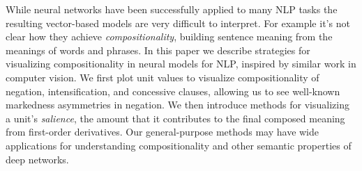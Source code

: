 While neural networks have been successfully applied to many NLP tasks the resulting vector-based models are very difficult to interpret. For example it's not clear how they achieve {\em compositionality}, building sentence meaning from the meanings of words and phrases. In this paper we describe strategies for visualizing compositionality in neural models for NLP, inspired by similar work in computer vision. We first plot unit values to visualize compositionality of negation, intensification, and concessive clauses, allowing us to see well-known markedness asymmetries in negation. We then introduce methods for visualizing a unit's {\em salience}, the amount that it contributes to the final composed meaning from first-order derivatives. Our general-purpose methods may have wide applications for understanding compositionality and other semantic properties of deep networks.
